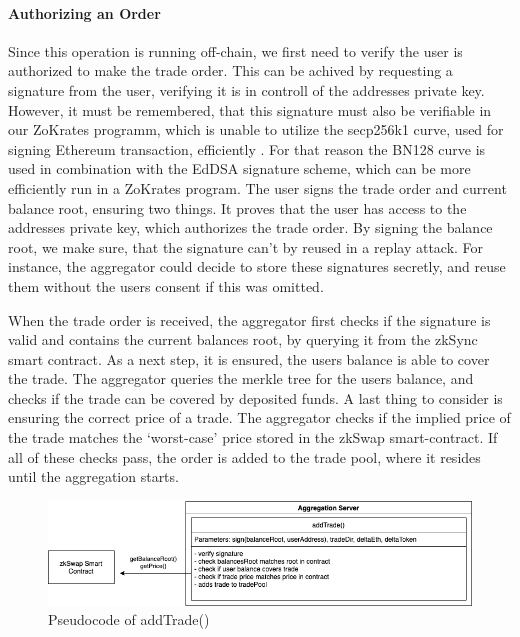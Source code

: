 \documentclass[../../thesis.tex]{subfiles}
\begin{document}
\paragraph{Authorizing an Order}
Since this operation is running off-chain, we first need to verify the user is authorized to make the trade order. This can be achived by requesting a signature from the user, verifying it is in controll of the addresses private key. However, it must be remembered, that this signature must also be verifiable in our ZoKrates programm, which is unable to utilize the secp256k1 curve, used for signing Ethereum transaction, efficiently \cite{deml_2019}. For that reason the BN128 curve is used in combination with the EdDSA signature scheme, which can be more efficiently run in a ZoKrates program. The user signs the trade order and current balance root, ensuring two things. It proves that the user has access to the addresses private key, which authorizes the trade order. By signing the balance root, we make sure, that the signature can't by reused in a replay attack. For instance, the aggregator could decide to store these signatures secretly, and reuse them without the users consent if this was omitted. 

When the trade order is received, the aggregator first checks if the signature is valid and contains the current balances root, by querying it from the zkSync smart contract. As a next step, it is ensured, the users balance is able to cover the trade. The aggregator queries the merkle tree for the users balance, and checks if the trade can be covered by deposited funds. A last thing to consider is ensuring the correct price of a trade. The aggregator checks if the implied price of the trade matches the `worst-case' price stored in the zkSwap smart-contract. If all of these checks pass, the order is added to the trade pool, where it resides until the aggregation starts.  

\begin{figure}[h]
    \centerline{\includegraphics[totalheight=3cm]{diagrams/addTrade.png}}
    \caption{Pseudocode of addTrade()}
    \label{fig:addTrade}
\end{figure}
\end{document}

